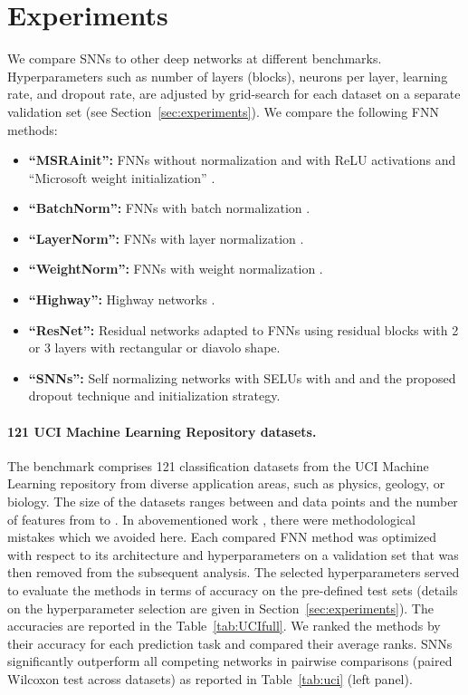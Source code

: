 \documentclass{article}
\begin{document}
\section*{Experiments}
We compare SNNs to other deep networks at different
benchmarks. 
Hyperparameters such as
number of layers (blocks), neurons per layer, learning rate, and dropout rate,
are adjusted by grid-search for each dataset on a separate validation set
(see Section~\ref{sec:experiments}). 
We compare the following FNN methods: 
\begin{itemize}
\item {\bf ``MSRAinit'':} FNNs without normalization and 
with ReLU activations and ``Microsoft weight initialization'' \citep{bib:He2015init}.
\item {\bf ``BatchNorm'':} FNNs with batch normalization \citep{bib:Ioffe2015}. 
\item {\bf ``LayerNorm'':} FNNs with layer normalization \citep{bib:Ba2016}. 
\item {\bf ``WeightNorm'':} FNNs with weight normalization \citep{bib:Salimans2016}. 
\item {\bf ``Highway'':} Highway networks \citep{bib:Srivastava2015}.
\item {\bf ``ResNet'':} Residual networks \citep{bib:He2015res} adapted to FNNs  
using residual blocks with 2 or 3 layers with rectangular or diavolo shape. 
\item {\bf ``SNNs'':} Self normalizing networks with SELUs with  and  and 
the proposed dropout technique and initialization strategy. 
\end{itemize}






\paragraph{121 UCI Machine Learning Repository datasets.} 
The benchmark comprises 121 classification datasets from the UCI Machine Learning repository \cite{bib:Fernandez2014} 
from diverse application areas, such as physics, geology, or biology.
The size of the datasets ranges between  and  data points and the 
number of features from  to . 
In abovementioned work \citep{bib:Fernandez2014},
there were methodological mistakes \citep{bib:Wainberg2016} which we avoided here. 
Each compared FNN method
was optimized with respect to its architecture and hyperparameters on a validation set that was then 
removed from the subsequent analysis. 
The selected hyperparameters served to evaluate the methods in terms of accuracy on 
the pre-defined test sets (details on the hyperparameter selection are given in Section~\ref{sec:experiments}).
The accuracies are reported in the Table~\ref{tab:UCIfull}. 
We ranked the methods by their accuracy for each
prediction task and compared their average ranks.
SNNs significantly outperform all competing networks in pairwise comparisons (paired
Wilcoxon test across datasets) as reported in Table~\ref{tab:uci} (left panel).
\end{document}
